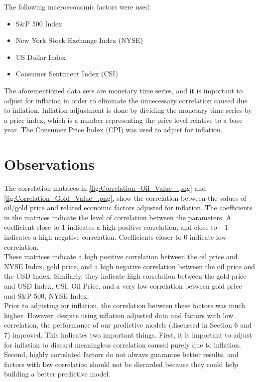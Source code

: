 \documentclass[runningheads]{llncs}
\begin{document}
The following macroeconomic factors were used:

\begin {itemize}
\item S\&P 500 Index \cite{quandal}
\item New York Stock Exchange Index (NYSE) \cite{quandal}
\item US Dollar Index \cite{quandal}
\item Consumer Sentiment Index (CSI) \cite{csi}
\end {itemize}


\noindent The aforementioned data sets are monetary time series, and it is important to adjust for inflation in order to eliminate the unnecessary correlation caused due to inflation. Inflation adjustment is done by dividing the monetary time series by a price index, which is a number representing the price level relative to a base year. The Consumer Price Index (CPI) was used to adjust for inflation.

\newpage

\section{Observations}

\noindent The correlation matrices in \autoref{fig:Correlation_Oil_Value_.png} and \autoref{fig:Correlation_Gold_Value_.png}, show the correlation between the values of oil/gold price and related economic factors adjusted for inflation. The coefficients in the matrices indicate the level of correlation between the parameters. A coefficient close to $1$ indicates a high positive correlation, and close to $-1$ indicates a high negative correlation. Coefficients closer to $0$ indicate low correlation. \\

\noindent These matrices indicate a high positive correlation between the oil price and NYSE Index, gold price, and a high negative correlation between the oil price and the USD Index. Similarly, they indicate high correlation between the gold price and USD Index, CSI, Oil Price, and a very low correlation between gold price and S\&P 500, NYSE Index.\\

\noindent Prior to adjusting for inflation, the correlation between these factors was much higher. However, despite using inflation adjusted data and factors with low correlation, the performance of our predictive models (discussed in Section 6 and 7) improved. This indicates two important things. First, it is important to adjust for inflation to discard meaningless correlation caused purely due to inflation. Second, highly correlated factors do not always guarantee better results, and factors with low correlation should not be discarded because they could help building a better predictive model.     
\end{document}
